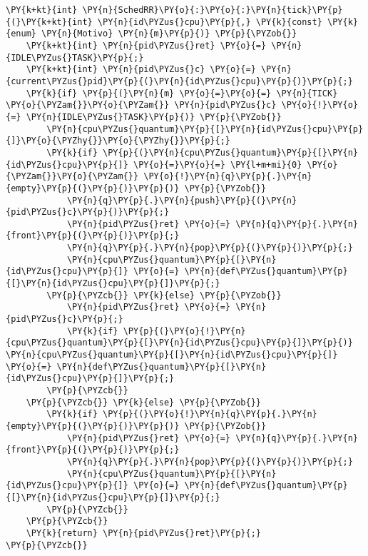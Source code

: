 \begin{Verbatim}[commandchars=\\\{\}]
\PY{k+kt}{int} \PY{n}{SchedRR}\PY{o}{:}\PY{o}{:}\PY{n}{tick}\PY{p}{(}\PY{k+kt}{int} \PY{n}{id\PYZus{}cpu}\PY{p}{,} \PY{k}{const} \PY{k}{enum} \PY{n}{Motivo} \PY{n}{m}\PY{p}{)} \PY{p}{\PYZob{}}
    \PY{k+kt}{int} \PY{n}{pid\PYZus{}ret} \PY{o}{=} \PY{n}{IDLE\PYZus{}TASK}\PY{p}{;}
    \PY{k+kt}{int} \PY{n}{pid\PYZus{}c} \PY{o}{=} \PY{n}{current\PYZus{}pid}\PY{p}{(}\PY{n}{id\PYZus{}cpu}\PY{p}{)}\PY{p}{;}
    \PY{k}{if} \PY{p}{(}\PY{n}{m} \PY{o}{=}\PY{o}{=} \PY{n}{TICK} \PY{o}{\PYZam{}}\PY{o}{\PYZam{}} \PY{n}{pid\PYZus{}c} \PY{o}{!}\PY{o}{=} \PY{n}{IDLE\PYZus{}TASK}\PY{p}{)} \PY{p}{\PYZob{}}
        \PY{n}{cpu\PYZus{}quantum}\PY{p}{[}\PY{n}{id\PYZus{}cpu}\PY{p}{]}\PY{o}{\PYZhy{}}\PY{o}{\PYZhy{}}\PY{p}{;}
        \PY{k}{if} \PY{p}{(}\PY{n}{cpu\PYZus{}quantum}\PY{p}{[}\PY{n}{id\PYZus{}cpu}\PY{p}{]} \PY{o}{=}\PY{o}{=} \PY{l+m+mi}{0} \PY{o}{\PYZam{}}\PY{o}{\PYZam{}} \PY{o}{!}\PY{n}{q}\PY{p}{.}\PY{n}{empty}\PY{p}{(}\PY{p}{)}\PY{p}{)} \PY{p}{\PYZob{}}
            \PY{n}{q}\PY{p}{.}\PY{n}{push}\PY{p}{(}\PY{n}{pid\PYZus{}c}\PY{p}{)}\PY{p}{;}
            \PY{n}{pid\PYZus{}ret} \PY{o}{=} \PY{n}{q}\PY{p}{.}\PY{n}{front}\PY{p}{(}\PY{p}{)}\PY{p}{;}
            \PY{n}{q}\PY{p}{.}\PY{n}{pop}\PY{p}{(}\PY{p}{)}\PY{p}{;}
            \PY{n}{cpu\PYZus{}quantum}\PY{p}{[}\PY{n}{id\PYZus{}cpu}\PY{p}{]} \PY{o}{=} \PY{n}{def\PYZus{}quantum}\PY{p}{[}\PY{n}{id\PYZus{}cpu}\PY{p}{]}\PY{p}{;}
        \PY{p}{\PYZcb{}} \PY{k}{else} \PY{p}{\PYZob{}}
            \PY{n}{pid\PYZus{}ret} \PY{o}{=} \PY{n}{pid\PYZus{}c}\PY{p}{;}
            \PY{k}{if} \PY{p}{(}\PY{o}{!}\PY{n}{cpu\PYZus{}quantum}\PY{p}{[}\PY{n}{id\PYZus{}cpu}\PY{p}{]}\PY{p}{)} \PY{n}{cpu\PYZus{}quantum}\PY{p}{[}\PY{n}{id\PYZus{}cpu}\PY{p}{]} \PY{o}{=} \PY{n}{def\PYZus{}quantum}\PY{p}{[}\PY{n}{id\PYZus{}cpu}\PY{p}{]}\PY{p}{;}
        \PY{p}{\PYZcb{}}
    \PY{p}{\PYZcb{}} \PY{k}{else} \PY{p}{\PYZob{}}
        \PY{k}{if} \PY{p}{(}\PY{o}{!}\PY{n}{q}\PY{p}{.}\PY{n}{empty}\PY{p}{(}\PY{p}{)}\PY{p}{)} \PY{p}{\PYZob{}}
            \PY{n}{pid\PYZus{}ret} \PY{o}{=} \PY{n}{q}\PY{p}{.}\PY{n}{front}\PY{p}{(}\PY{p}{)}\PY{p}{;}
            \PY{n}{q}\PY{p}{.}\PY{n}{pop}\PY{p}{(}\PY{p}{)}\PY{p}{;}
            \PY{n}{cpu\PYZus{}quantum}\PY{p}{[}\PY{n}{id\PYZus{}cpu}\PY{p}{]} \PY{o}{=} \PY{n}{def\PYZus{}quantum}\PY{p}{[}\PY{n}{id\PYZus{}cpu}\PY{p}{]}\PY{p}{;}
        \PY{p}{\PYZcb{}}
    \PY{p}{\PYZcb{}}
    \PY{k}{return} \PY{n}{pid\PYZus{}ret}\PY{p}{;}
\PY{p}{\PYZcb{}}
\end{Verbatim}